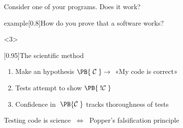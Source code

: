 \begin{frame}{Consider one of your programs. Does it work?}
    \vspace{-2mm}
    \begin{varblock}{example}[0.8\textwidth]{How do you prove that a software works?}
    \end{varblock}
    \begin{uncoverenv}<3>
        \vspace{2mm}
        \begin{varblock}{}[0.95\textwidth]{The scientific method}
            \begin{enumerate}
                \item Make an hypothesis $\PB{\;\mathcal{C}\;}\to\;$  «My code is correct»
                \item Tests attempt to show $\PB{\;!\mathcal{C}\;}$
                \item Confidence in $\;\PB{\mathcal{C}\;}$ tracks thoroughness of tests
            \end{enumerate}
            \vspace{-2mm}
            \vspace{-6mm}
            \begin{center}
                \large
                \alert{Testing code is science} $\;\Leftrightarrow\;$ Popper's falsification principle
            \end{center}
        \end{varblock}
    \end{uncoverenv}
\end{frame}
